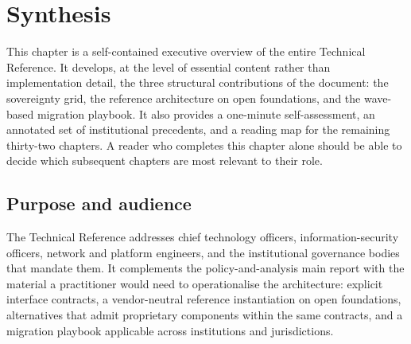 
\chapter{Synthesis}
\label{ch:synthesis}

This chapter is a self-contained executive overview of the entire
Technical Reference. It develops, at the level of essential
content rather than implementation detail, the three structural
contributions of the document: the sovereignty grid, the
reference architecture on open foundations, and the wave-based
migration playbook. It also provides a one-minute
self-assessment, an annotated set of institutional precedents,
and a reading map for the remaining thirty-two chapters. A
reader who completes this chapter alone should be able to decide
which subsequent chapters are most relevant to their role.

\section{Purpose and audience}
\label{sec:synth-purpose}

The Technical Reference addresses chief technology officers,
information-security officers, network and platform engineers,
and the institutional governance bodies that mandate them. It
complements the policy-and-analysis main report with the
material a practitioner would need to operationalise the
architecture: explicit interface contracts, a vendor-neutral
reference instantiation on open foundations, alternatives that
admit proprietary components within the same contracts, and a
migration playbook applicable across institutions and
jurisdictions.


